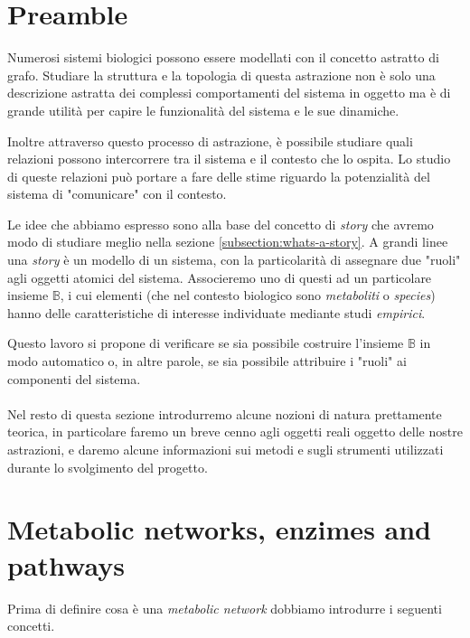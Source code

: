 
\section{Preamble}
Numerosi sistemi biologici possono essere modellati con il concetto
astratto di grafo. Studiare la struttura e la topologia di questa
astrazione non \`e solo una descrizione astratta dei complessi
comportamenti del sistema in oggetto ma \`e di grande utilit\`a per
capire le funzionalit\`a del sistema e le sue dinamiche.

Inoltre attraverso questo processo di astrazione, \`e possibile
studiare quali relazioni possono intercorrere tra il sistema e il
contesto che lo ospita. Lo studio di queste relazioni pu\`o portare a
fare delle stime riguardo la potenzialit\`a del sistema di
"comunicare" con il contesto.

Le idee che abbiamo espresso sono alla base del concetto di
\emph{story} che avremo modo di studiare meglio nella sezione
\ref{subsection:whats-a-story}. A grandi linee una \emph{story} \`e un
modello di un sistema, con la particolarit\`a di assegnare due "ruoli"
agli oggetti atomici del sistema. Associeremo uno di questi ad un
particolare insieme $\mathbb{B}$, i cui elementi (che nel contesto
biologico sono \emph{metaboliti} o \emph{species}) hanno delle
caratteristiche di interesse individuate mediante studi
\emph{empirici}.

Questo lavoro si propone di verificare se sia possibile costruire
l'insieme $\mathbb{B}$ in modo automatico o, in altre parole, se sia
possibile attribuire i "ruoli" ai componenti del sistema.
\\\\
Nel resto di questa sezione introdurremo alcune nozioni di natura
prettamente teorica, in particolare faremo un breve cenno agli oggetti
reali oggetto delle nostre astrazioni, e daremo alcune informazioni
sui metodi e sugli strumenti utilizzati durante lo svolgimento del
progetto.

\section{Metabolic networks, enzimes and pathways}

Prima di definire cosa \`e una \emph{metabolic network} dobbiamo
introdurre i seguenti concetti.

